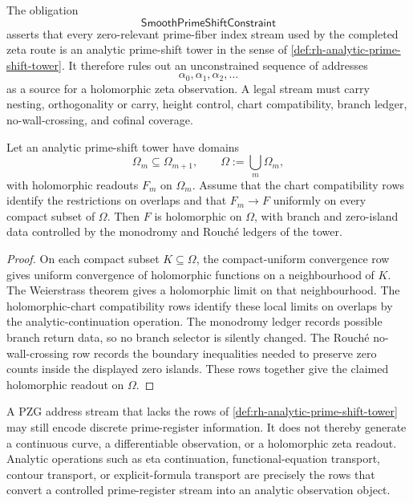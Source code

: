 \begin{definition}[SmoothPrimeShiftConstraint]
\label{def:rh-smooth-prime-shift-constraint}
The obligation
$$
\mathsf{SmoothPrimeShiftConstraint}
$$
asserts that every zero-relevant prime-fiber index stream used by the
completed zeta route is an analytic prime-shift tower in the sense of
\autoref{def:rh-analytic-prime-shift-tower}. It therefore rules out an
unconstrained sequence of addresses
$$
\alpha_0,\alpha_1,\alpha_2,\ldots
$$
as a source for a holomorphic zeta observation. A legal stream must
carry nesting, orthogonality or carry, height control, chart
compatibility, branch ledger, no-wall-crossing, and cofinal coverage.
\end{definition}

\begin{theorem}
\label{thm:rh-analytic-prime-shift-tower-holomorphic-readout}
Let an analytic prime-shift tower have domains
$$
\Omega_m\subseteq\Omega_{m+1},
\qquad
\Omega:=\bigcup_m\Omega_m,
$$
with holomorphic readouts $F_m$ on $\Omega_m$. Assume that the chart
compatibility rows identify the restrictions on overlaps and that
$F_m\to F$ uniformly on every compact subset of $\Omega$. Then $F$ is
holomorphic on $\Omega$, with branch and zero-island data controlled by
the monodromy and Rouch\'e ledgers of the tower.
\end{theorem}

\begin{proof}
On each compact subset $K\subseteq\Omega$, the compact-uniform convergence
row gives uniform convergence of holomorphic functions on a neighbourhood
of $K$. The Weierstrass theorem gives a holomorphic limit on that
neighbourhood. The holomorphic-chart compatibility rows identify these
local limits on overlaps by the analytic-continuation operation. The
monodromy ledger records possible branch return data, so no branch
selector is silently changed. The Rouch\'e no-wall-crossing row records
the boundary inequalities needed to preserve zero counts inside the
displayed zero islands. These rows together give the claimed holomorphic
readout on $\Omega$.
\end{proof}

\begin{principle}
\label{prin:rh-nonanalytic-prime-shifts-remain-address-streams}
A PZG address stream that lacks the rows of
\autoref{def:rh-analytic-prime-shift-tower} may still encode discrete
prime-register information. It does not thereby generate a continuous
curve, a differentiable observation, or a holomorphic zeta readout.
Analytic operations such as eta continuation, functional-equation
transport, contour transport, or explicit-formula transport are precisely
the rows that convert a controlled prime-register stream into an
analytic observation object.
\end{principle}

